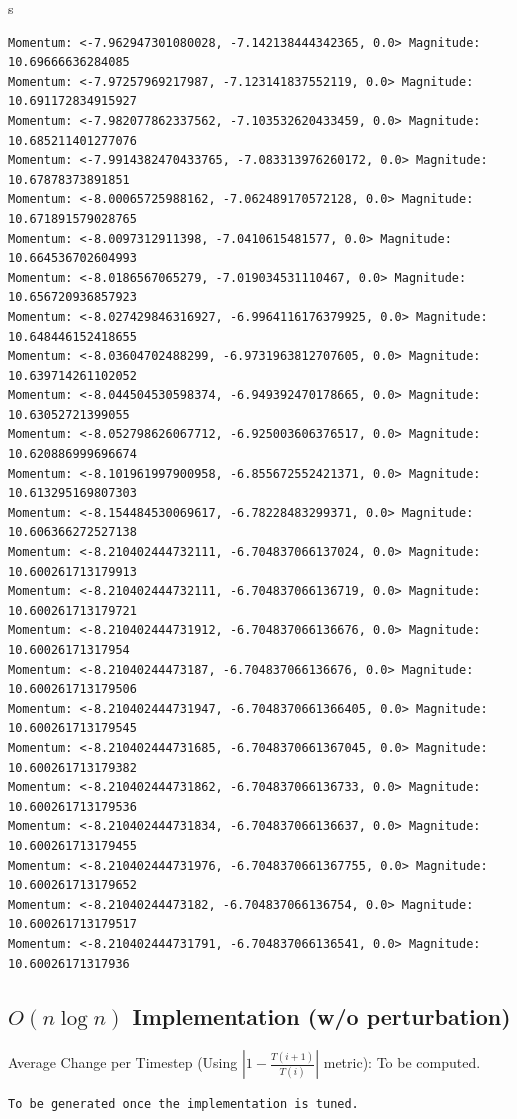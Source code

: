 s\documentclass[10pt]{article}
\begin{document}
\begin{verbatim}
Momentum: <-7.962947301080028, -7.142138444342365, 0.0> Magnitude: 10.69666636284085
Momentum: <-7.97257969217987, -7.123141837552119, 0.0> Magnitude: 10.691172834915927
Momentum: <-7.982077862337562, -7.103532620433459, 0.0> Magnitude: 10.685211401277076
Momentum: <-7.9914382470433765, -7.083313976260172, 0.0> Magnitude: 10.67878373891851
Momentum: <-8.00065725988162, -7.062489170572128, 0.0> Magnitude: 10.671891579028765
Momentum: <-8.0097312911398, -7.0410615481577, 0.0> Magnitude: 10.664536702604993
Momentum: <-8.0186567065279, -7.019034531110467, 0.0> Magnitude: 10.656720936857923
Momentum: <-8.027429846316927, -6.9964116176379925, 0.0> Magnitude: 10.648446152418655
Momentum: <-8.03604702488299, -6.9731963812707605, 0.0> Magnitude: 10.639714261102052
Momentum: <-8.044504530598374, -6.949392470178665, 0.0> Magnitude: 10.63052721399055
Momentum: <-8.052798626067712, -6.925003606376517, 0.0> Magnitude: 10.620886999696674
Momentum: <-8.101961997900958, -6.855672552421371, 0.0> Magnitude: 10.613295169807303
Momentum: <-8.154484530069617, -6.78228483299371, 0.0> Magnitude: 10.606366272527138
Momentum: <-8.210402444732111, -6.704837066137024, 0.0> Magnitude: 10.600261713179913
Momentum: <-8.210402444732111, -6.704837066136719, 0.0> Magnitude: 10.600261713179721
Momentum: <-8.210402444731912, -6.704837066136676, 0.0> Magnitude: 10.60026171317954
Momentum: <-8.21040244473187, -6.704837066136676, 0.0> Magnitude: 10.600261713179506
Momentum: <-8.210402444731947, -6.7048370661366405, 0.0> Magnitude: 10.600261713179545
Momentum: <-8.210402444731685, -6.7048370661367045, 0.0> Magnitude: 10.600261713179382
Momentum: <-8.210402444731862, -6.704837066136733, 0.0> Magnitude: 10.600261713179536
Momentum: <-8.210402444731834, -6.704837066136637, 0.0> Magnitude: 10.600261713179455
Momentum: <-8.210402444731976, -6.7048370661367755, 0.0> Magnitude: 10.600261713179652
Momentum: <-8.21040244473182, -6.704837066136754, 0.0> Magnitude: 10.600261713179517
Momentum: <-8.210402444731791, -6.704837066136541, 0.0> Magnitude: 10.60026171317936
\end{verbatim}
\small


\subsection{$O(n \log n)$ Implementation (w/o perturbation)}
Average Change per Timestep (Using $|1 - \frac{T(i+1)}{T(i)}|$ metric): To be computed.
\footnotesize
\begin{verbatim}
To be generated once the implementation is tuned.
\end{verbatim}
\small
\end{document}
